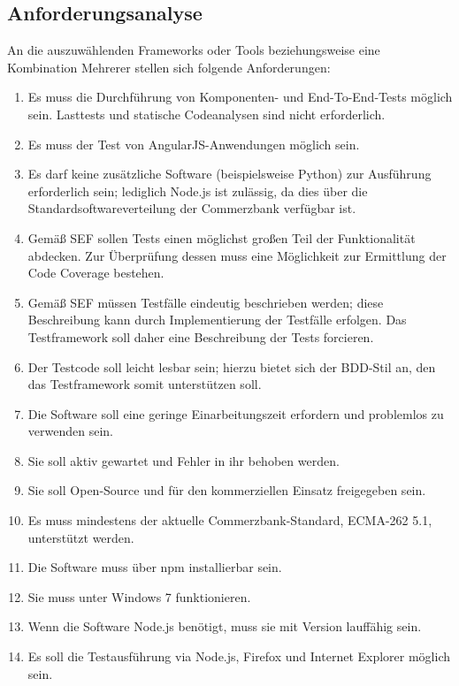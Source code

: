 \subsection{Anforderungsanalyse}
An die auszuwählenden Frameworks oder Tools beziehungsweise eine Kombination Mehrerer stellen sich folgende Anforderungen:
\begin{enumerate}
	\item Es muss die Durchführung von Komponenten- und End-To-End-Tests möglich sein. Lasttests und statische Codeanalysen sind nicht erforderlich.
	\item Es muss der Test von AngularJS-Anwendungen möglich sein.
	\item Es darf keine zusätzliche Software (beispielsweise Python) zur Ausführung erforderlich sein; lediglich Node.js ist zulässig, da dies über die Standardsoftwareverteilung der Commerzbank verfügbar ist.
	\item Gemäß SEF sollen Tests \glqq einen möglichst großen Teil der Funktionalität abdecken\grqq{}\cite{coba-sef}. Zur Überprüfung dessen muss eine Möglichkeit zur Ermittlung der Code Coverage bestehen.
	\item Gemäß SEF müssen Testfälle eindeutig beschrieben werden; diese Beschreibung kann durch Implementierung der Testfälle erfolgen\cite{coba-sef}. Das Testframework soll daher eine Beschreibung der Tests forcieren.
	\item Der Testcode soll leicht lesbar sein\cite[][7]{coba-programmierrichtlinienAllgemein}; hierzu bietet sich der BDD-Stil an, den das Testframework somit unterstützen soll.
	\item Die Software soll eine geringe Einarbeitungszeit erfordern und problemlos zu verwenden sein. 
	\item Sie soll aktiv gewartet und Fehler in ihr behoben werden.
	\item Sie soll Open-Source und für den kommerziellen Einsatz freigegeben sein.
	\item Es muss mindestens der aktuelle Commerzbank-Standard, ECMA-262 5.1, unterstützt werden\cite[][10]{coba-programmierrichtlinienJavaScript}.
	\item Die Software muss über npm installierbar sein.
	\item Sie muss unter Windows 7 funktionieren.
	\item Wenn die Software Node.js benötigt, muss sie mit Version  lauffähig sein.
	\item Es soll die Testausführung via Node.js, Firefox  und Internet Explorer  möglich sein.

\end{enumerate}

